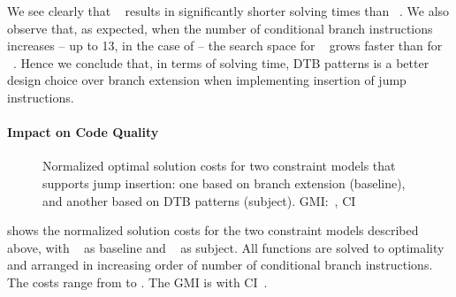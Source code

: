 We see clearly that ~ results
in significantly shorter solving times than ~.
%
We also observe that, as expected, when the number of conditional branch
\glspl{instruction} increases -- up to \num{13}, in the case of
 -- the \gls{search space} for ~ grows faster than for ~.
%
Hence we conclude that, in terms of solving time,
\glspl{DTB pattern} is a better design choice over \gls{branch extension} when
implementing insertion of jump \glspl{instruction}.


\paragraph{Impact on Code Quality}



\begin{figure}
  \centering%
  \maxsizebox{\textwidth}{!}{%
    \trimBarchartPlot{%
    }%
  }

  \caption[%
            Plot comparing optimal solution costs for two constraint models
            supporing jump instruction insertion%
          ]%
          {%
            Normalized optimal solution costs for two constraint models that
            supports jump insertion: one based on branch extension (baseline),
            and another based on DTB patterns (subject).
            GMI:~\printGMI{%
              \DualTargetPatternsVsBranchExtCyclesSpeedupCyclesRegularSpeedupGmean%
            },
            CI~\printGMICI{%
              \DualTargetPatternsVsBranchExtCyclesSpeedupCyclesRegularSpeedupCiMin%
            }{%
              \DualTargetPatternsVsBranchExtCyclesSpeedupCyclesRegularSpeedupCiMax%
            }%
          }
\end{figure}

 shows
the normalized \gls{solution} costs for the two \glspl{constraint model}
described above, with ~ as
\gls{baseline} and ~ as
\gls{subject}.
%
All \glspl{function} are solved to optimality and arranged in increasing order
of number of conditional branch \glspl{instruction}.
%
The costs range from
\printMinCycles{
  \DualTargetPatternsVsBranchExtCyclesSpeedupCyclesAvgMin,
  \DualTargetPatternsVsBranchExtCyclesSpeedupBaselineCyclesAvgMin
} to
\printMaxCycles{
  \DualTargetPatternsVsBranchExtCyclesSpeedupCyclesAvgMax,
  \DualTargetPatternsVsBranchExtCyclesSpeedupBaselineCyclesAvgMax
}.
%
The \gls{GMI} is \printGMI{%
  \DualTargetPatternsVsBranchExtCyclesSpeedupCyclesRegularSpeedupGmean%
} with \gls{CI}~\printGMICI{%
  \DualTargetPatternsVsBranchExtCyclesSpeedupCyclesRegularSpeedupCiMin%
}{%
    \DualTargetPatternsVsBranchExtCyclesSpeedupCyclesRegularSpeedupCiMax%
}.

